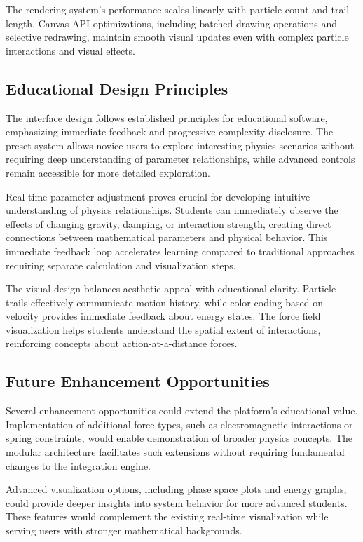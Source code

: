 \documentclass[12pt,journal,onecolumn]{IEEEtran}
\begin{document}
The rendering system's performance scales linearly with particle count and trail length. Canvas API optimizations, including batched drawing operations and selective redrawing, maintain smooth visual updates even with complex particle interactions and visual effects.

\subsection{Educational Design Principles}
The interface design follows established principles for educational software, emphasizing immediate feedback and progressive complexity disclosure. The preset system allows novice users to explore interesting physics scenarios without requiring deep understanding of parameter relationships, while advanced controls remain accessible for more detailed exploration.

Real-time parameter adjustment proves crucial for developing intuitive understanding of physics relationships. Students can immediately observe the effects of changing gravity, damping, or interaction strength, creating direct connections between mathematical parameters and physical behavior. This immediate feedback loop accelerates learning compared to traditional approaches requiring separate calculation and visualization steps.

The visual design balances aesthetic appeal with educational clarity. Particle trails effectively communicate motion history, while color coding based on velocity provides immediate feedback about energy states. The force field visualization helps students understand the spatial extent of interactions, reinforcing concepts about action-at-a-distance forces.

\subsection{Future Enhancement Opportunities}
Several enhancement opportunities could extend the platform's educational value. Implementation of additional force types, such as electromagnetic interactions or spring constraints, would enable demonstration of broader physics concepts. The modular architecture facilitates such extensions without requiring fundamental changes to the integration engine.

Advanced visualization options, including phase space plots and energy graphs, could provide deeper insights into system behavior for more advanced students. These features would complement the existing real-time visualization while serving users with stronger mathematical backgrounds.
\end{document}
